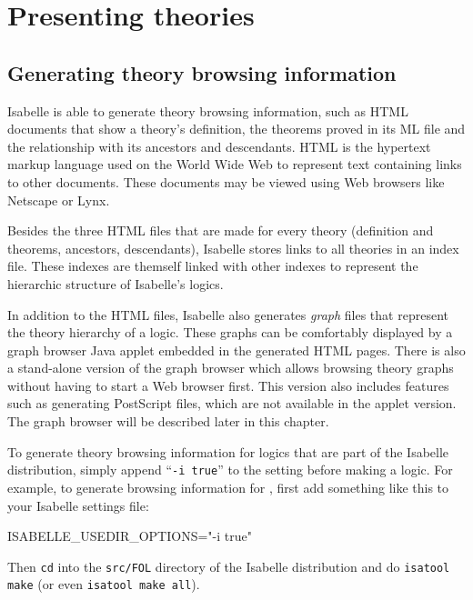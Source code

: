 

\chapter{Presenting theories}

\section{Generating theory browsing information} \label{sec:info}

Isabelle is able to generate theory browsing information, such as HTML
documents that show a theory's definition, the theorems proved in its
ML file and the relationship with its ancestors and descendants. HTML
is the hypertext markup language used on the World Wide Web to
represent text containing links to other documents.  These documents
may be viewed using Web browsers like Netscape or Lynx.

Besides the three HTML files that are made for every theory
(definition and theorems, ancestors, descendants), Isabelle stores
links to all theories in an index file. These indexes are themself
linked with other indexes to represent the hierarchic structure of
Isabelle's logics.

In addition to the HTML files, Isabelle also generates \emph{graph}
files that represent the theory hierarchy of a logic.  These graphs
can be comfortably displayed by a graph browser Java applet embedded
in the generated HTML pages. There is also a stand-alone version of
the graph browser which allows browsing theory graphs without having
to start a Web browser first. This version also includes features such
as generating {\sc PostScript} files, which are not available in the
applet version. The graph browser will be described later in this
chapter.

\medskip To generate theory browsing information for logics that are
part of the Isabelle distribution, simply append ``\texttt{-i true}''
to the  setting before making a logic.
For example, to generate browsing information for {\FOL}, first add
something like this to your Isabelle settings file:
\begin{ttbox}
ISABELLE_USEDIR_OPTIONS="-i true"
\end{ttbox}
Then \texttt{cd} into the \texttt{src/FOL} directory of the Isabelle
distribution and do \texttt{isatool make} (or even \texttt{isatool
  make all}).

